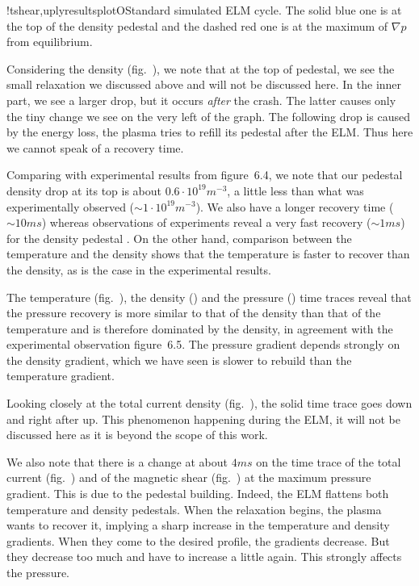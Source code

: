 \begin{AllFigs}{}{!t}{}{shear,upl}{y}{resultsplotO}{Standard simulated ELM cycle. The solid blue one is at the top of the density pedestal and the dashed red one is at the maximum of $\nabla p$ from equilibrium.}
\end{AllFigs}
Considering the density (fig.~), we note that at the top of pedestal, we see the small relaxation we discussed above and will not be discussed here. In the inner part, we see a larger drop, but it occurs \emph{after} the crash. The latter causes only the tiny change we see on the very left of the graph. The following drop is caused by the energy loss, the plasma tries to refill its pedestal after the ELM. Thus here we cannot speak of a recovery time.
		
Comparing with experimental results from \cite{andreas2010} figure~6.4, we note that our pedestal density drop at its top is about $0.6 \cdot 10^{19} m^{-3}$, a little less than what was experimentally observed ($\sim 1 \cdot 10^{19} m^{-3}$). We also have a longer recovery time ($\sim 10ms$) whereas observations of experiments reveal a very fast recovery ($\sim 1ms$) for the density pedestal \cite{andreas2010}. On the other hand, comparison between the temperature and the density shows that the temperature is faster to recover than the density, as is the case in the experimental results.

The temperature (fig.~), the density () and the pressure () time traces reveal that the pressure recovery is more similar to that of the density than that of the temperature and is therefore dominated by the density, in agreement with the experimental observation \cite{andreas2010} figure~6.5. The pressure gradient depends strongly on the density gradient, which we have seen is slower to rebuild than the temperature gradient.
		
Looking closely at the total current density (fig.~), the solid time trace goes down and right after up. This phenomenon happening during the ELM, it will not be discussed here as it is beyond the scope of this work.

We also note that there is a change at about $4ms$ on the time trace of the total current (fig.~) and of the magnetic shear (fig.~) at the maximum pressure gradient. This is due to the pedestal building. Indeed, the ELM flattens both temperature and density pedestals. When the relaxation begins, the plasma wants to recover it, implying a sharp increase in the temperature and density gradients. When they come to the desired profile, the gradients decrease. But they decrease too much and have to increase a little again. This strongly affects the pressure.

